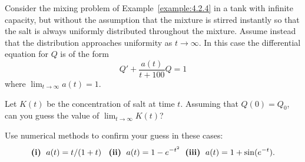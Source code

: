 \begin{exerciselist}
  \item\label{exer:4.2.23} \Lex Consider the mixing problem of Example~\ref{example:4.2.4} in a tank
        with infinite capacity, but without the assumption that the mixture is stirred instantly so
        that the salt is always uniformly distributed throughout the mixture. Assume instead that
        the distribution approaches uniformity as $t\to\infty$. In this case the differential
        equation for $Q$ is of the form
  \[
    Q'+\frac{a(t)}{t+100}Q=1
  \]
  where $\lim_{t\to\infty}a(t)=1$.
  \begin{alist}
    \item %
    Let $K(t)$ be the concentration of salt at time $t$. Assuming that $Q(0)=Q_{0}$, can you guess
    the value of $\lim_{t\to\infty}K(t)$?

    \item %
    Use numerical methods to confirm your guess in these cases:
    \[
      \mbox{{\bf (i)}\; }a(t)=t/(1+t)\;\mbox{\; {\bf (ii)}\; }a(t)=1-e^{-t^{2}}\mbox{\; {\bf (iii)}\; }a(t)=1+\sin(e^{-t}).
    \]
  \end{alist}
\end{exerciselist}
